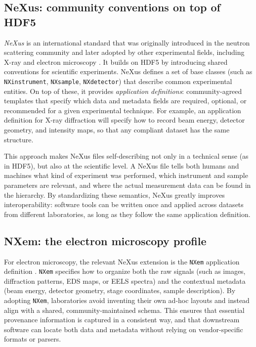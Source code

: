 \subsection{NeXus: community conventions on top of HDF5}

\textit{NeXus} is an international standard that was originally introduced in the neutron scattering community and later adopted by other experimental fields, including X-ray and electron microscopy \parencite{nxcanSASguide,nxvalidate}. 
It builds on HDF5 by introducing shared conventions for scientific experiments. 
NeXus defines a set of base classes (such as \texttt{NXinstrument}, \texttt{NXsample}, \texttt{NXdetector}) that describe common experimental entities. 
On top of these, it provides \textit{application definitions}: community-agreed templates that specify which data and metadata fields are required, optional, or recommended for a given experimental technique. 
For example, an application definition for X-ray diffraction will specify how to record beam energy, detector geometry, and intensity maps, so that any compliant dataset has the same structure. 


This approach makes NeXus files self-describing not only in a technical sense (as in HDF5), but also at the scientific level. 
A NeXus file tells both humans and machines what kind of experiment was performed, which instrument and sample parameters are relevant, and where the actual measurement data can be found in the hierarchy. 
By standardizing these semantics, NeXus greatly improves interoperability: software tools can be written once and applied across datasets from different laboratories, as long as they follow the same application definition.

\subsection{NXem: the electron microscopy profile}

For electron microscopy, the relevant NeXus extension is the \texttt{NXem} application definition \parencite{bazzocchiNexusEM,nexusEMStructure}. 
\texttt{NXem} specifies how to organize both the raw signals (such as images, diffraction patterns, EDS maps, or EELS spectra) and the contextual metadata (beam energy, detector geometry, stage coordinates, sample description). 
By adopting \texttt{NXem}, laboratories avoid inventing their own ad-hoc layouts and instead align with a shared, community-maintained schema. 
This ensures that essential provenance information is captured in a consistent way, and that downstream software can locate both data and metadata without relying on vendor-specific formats or parsers.

